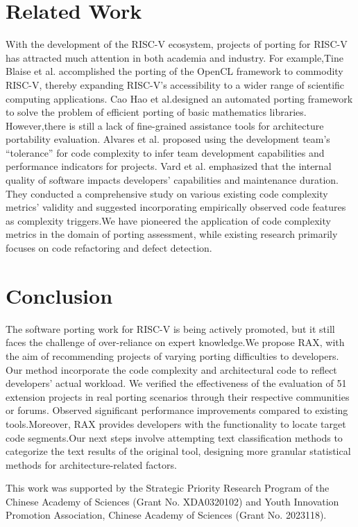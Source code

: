 \documentclass[sigconf,screen,review,anonymous]{acmart}
\begin{document}
\section{Related Work}
With the development of the RISC-V ecosystem,  projects of porting for RISC-V has attracted much attention in both academia and industry. For example,Tine Blaise et al.\cite{osti_1830102} accomplished the porting of the OpenCL framework to commodity RISC-V, thereby expanding RISC-V's accessibility to a wider range of scientific computing applications.
Cao Hao et al.\cite{2017Slow}designed an automated porting framework to solve the problem of efficient porting of basic mathematics libraries.
However,there is still a lack of fine-grained assistance tools for architecture portability evaluation.
Alvares et al. \cite{7844689} proposed using the development team's ``tolerance'' for code complexity to infer team development capabilities and performance indicators for projects.
Vard et al. \cite{2017Evaluating} emphasized that the internal quality of software impacts developers' capabilities and maintenance duration.
They conducted a comprehensive study on various existing code complexity metrics' validity and suggested incorporating empirically observed code features as complexity triggers.We have pioneered the application of code complexity metrics in the domain of porting assessment, while existing research primarily focuses on code refactoring and defect detection\cite{1993Software}.
\section{Conclusion}
The software porting work for RISC-V is being actively promoted, but it still faces the challenge of over-reliance on expert knowledge.We propose RAX, with the aim of recommending projects of varying porting difficulties to developers. Our method incorporate the code complexity and architectural code to reflect developers' actual workload. We verified the effectiveness of the evaluation of 51 extension projects in real porting scenarios through their respective communities or forums. Observed significant performance improvements compared to existing tools.Moreover, RAX provides developers with the functionality to locate target code segments.Our next steps involve attempting text classification methods to categorize the text results of the original tool, designing more granular statistical methods for architecture-related factors.
\begin{acks}
  This work was supported by the Strategic Priority Research Program of the Chinese Academy of Sciences (Grant No. XDA0320102) and Youth Innovation Promotion Association, Chinese Academy of Sciences (Grant No. 2023118).
\end{acks}



\end{document}
